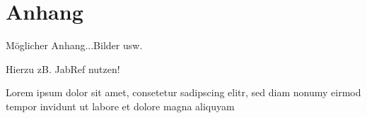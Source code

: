\chapter{Anhang}
\label{scr:Anhang}
Möglicher Anhang...Bilder usw.

Hierzu zB. JabRef nutzen!

Lorem ipsum dolor sit amet, consetetur sadipscing elitr, sed diam nonumy eirmod tempor invidunt ut labore et dolore magna aliquyam